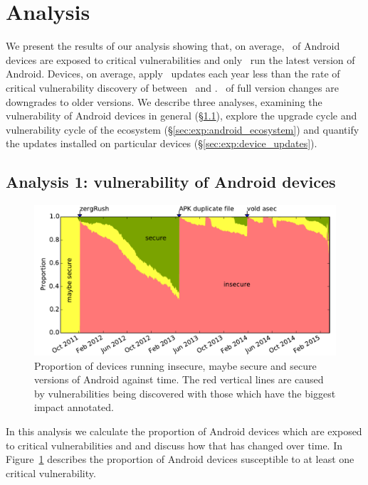 \documentclass{llncs}
\begin{document}
\section{Analysis}
\label{sec:results}
We present the results of our analysis showing that, on average, \daMeanInsecurityPerc\ of Android devices are exposed to critical vulnerabilities and only \daUpdatednessPerc\ run the latest version of Android.
Devices, on average, apply \daUpdatesPerYear\ updates each year less than the rate of critical vulnerability discovery of between \avoVulnsPerYearAllAndroid\ and \avoVulnsPerYear.
\daPercUpdatesDowngrades\ of full version changes are downgrades to older versions.
We describe three analyses, examining the vulnerability of Android devices in general (\S\ref{sec:exp:versionsecurity}), explore the upgrade cycle and vulnerability cycle of the ecosystem (\S\ref{sec:exp:android_ecosystem}) and quantify the updates installed on particular devices (\S\ref{sec:exp:device_updates}).

\subsection{Analysis 1: vulnerability of Android devices}\label{sec:exp:versionsecurity}
\begin{figure}[h]
\centering
\includegraphics[width=\columnwidth]{figures/proportioninsecure}
\caption{Proportion of devices running insecure, maybe secure and secure versions of Android against time.
The red vertical lines are caused by vulnerabilities being discovered with those which have the biggest impact annotated.
}
\label{fig:proportioninsecure}
\end{figure}
In this analysis we calculate the proportion of Android devices which are exposed to critical vulnerabilities and and discuss how that has changed over time.
In Figure~\ref{fig:proportioninsecure} describes the proportion of Android devices susceptible to at least one critical vulnerability.
\end{document}
